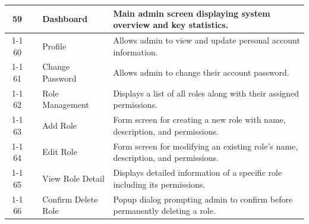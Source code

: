 \begin{longtable}{|c|>{\centering\arraybackslash}m{2.5cm}|p{3.5cm}|p{6cm}|}
59 &
\multirow{8}{2.5cm}{\centering Admin} &
Dashboard &
Main admin screen displaying system overview and key statistics.
\\ \cline{1-1}\cline{3-4}
60 &
&
Profile &
Allows admin to view and update personal account information.
\\ \cline{1-1}\cline{3-4}
61 &
&
Change Password &
Allows admin to change their account password.
\\ \cline{1-1}\cline{3-4}
62 &
&
Role Management &
Displays a list of all roles along with their assigned permissions.
\\ \cline{1-1}\cline{3-4}
63 &
&
Add Role &
Form screen for creating a new role with name, description, and permissions.
\\ \cline{1-1}\cline{3-4}
64 &
&
Edit Role &
Form screen for modifying an existing role's name, description, and permissions.
\\ \cline{1-1}\cline{3-4}
65 &
&
View Role Detail &
Displays detailed information of a specific role including its permissions.
\\ \cline{1-1}\cline{3-4}
66 &
&
Confirm Delete Role &
Popup dialog prompting admin to confirm before permanently deleting a role.
\\ \hline
\end{longtable}
